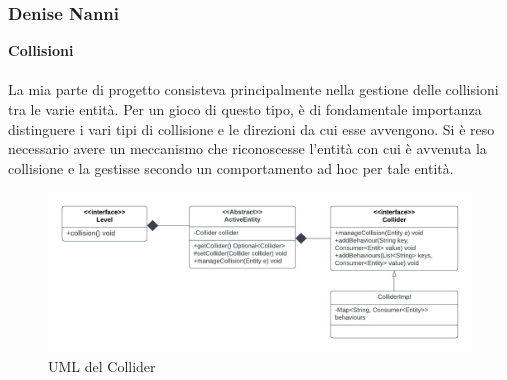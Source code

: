 \documentclass{article}
\begin{document}
\subsubsection{Denise Nanni}
\textbf{Collisioni}\\
\\
La mia parte di progetto consisteva principalmente nella gestione delle collisioni tra le varie entità.
Per un gioco di questo tipo, è di fondamentale importanza distinguere i vari tipi di collisione e le direzioni da cui esse avvengono. Si è reso necessario avere un meccanismo che riconoscesse l'entità con cui è avvenuta la collisione e la gestisse secondo un comportamento ad hoc per tale entità.

\begin{figure}[ht]
\includegraphics[width=1\textwidth]{umlCollider.jpg}
\caption{UML del Collider}
\label{fig:schgen}
\end{figure}
\end{document}
